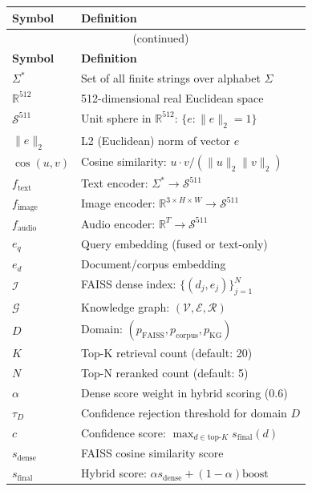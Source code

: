 \documentclass[12pt,a4paper]{article}
\begin{document}
\begin{longtable}{p{3.5cm} p{9.5cm}}
\toprule
\textbf{Symbol} & \textbf{Definition}\\
\midrule
\endfirsthead
\multicolumn{2}{c}{\tablename\ \thetable{} (continued)}\\
\toprule
\textbf{Symbol} & \textbf{Definition}\\
\midrule
\endhead
\bottomrule
\endlastfoot

$\Sigma^*$          & Set of all finite strings over alphabet $\Sigma$ \\
$\mathbb{R}^{512}$  & 512-dimensional real Euclidean space \\
$\mathcal{S}^{511}$ & Unit sphere in $\mathbb{R}^{512}$: $\{e: \|e\|_2 = 1\}$ \\
$\|e\|_2$           & L2 (Euclidean) norm of vector $e$ \\
$\cos(u, v)$        & Cosine similarity: $u \cdot v / (\|u\|_2 \|v\|_2)$ \\
$f_{\text{text}}$   & Text encoder: $\Sigma^* \to \mathcal{S}^{511}$ \\
$f_{\text{image}}$  & Image encoder: $\mathbb{R}^{3\times H\times W} \to \mathcal{S}^{511}$ \\
$f_{\text{audio}}$  & Audio encoder: $\mathbb{R}^T \to \mathcal{S}^{511}$ \\
$e_q$               & Query embedding (fused or text-only) \\
$e_d$               & Document/corpus embedding \\
$\mathcal{I}$       & FAISS dense index: $\{(d_j, e_j)\}_{j=1}^N$ \\
$\mathcal{G}$       & Knowledge graph: $(\mathcal{V}, \mathcal{E}, \mathcal{R})$ \\
$D$                 & Domain: $(p_{\text{FAISS}}, p_{\text{corpus}}, p_{\text{KG}})$ \\
$K$                 & Top-K retrieval count (default: 20) \\
$N$                 & Top-N reranked count (default: 5) \\
$\alpha$            & Dense score weight in hybrid scoring (0.6) \\
$\tau_D$            & Confidence rejection threshold for domain $D$ \\
$c$                 & Confidence score: $\max_{d \in \text{top-}K} s_{\text{final}}(d)$ \\
$s_{\text{dense}}$  & FAISS cosine similarity score \\
$s_{\text{final}}$  & Hybrid score: $\alpha s_{\text{dense}} + (1-\alpha)\text{boost}$ \\

\end{longtable}
\end{document}
